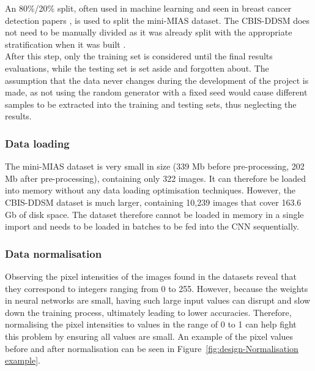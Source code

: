 An 80\%/20\% split, often used in machine learning and seen in breast cancer detection papers \citep{Yue2018}, is used to split the mini-MIAS dataset. The CBIS-DDSM does not need to be manually divided as it was already split with the appropriate stratification when it was built \citep{Lee2017}.\\

After this step, only the training set is considered until the final results evaluations, while the testing set is set aside and forgotten about. The assumption that the data never changes during the development of the project is made, as not using the random generator with a fixed seed would cause different samples to be extracted into the training and testing sets, thus neglecting the results. 

\subsubsection{Data loading}

The mini-MIAS dataset is very small in size (339 Mb before pre-processing, 202 Mb after pre-processing), containing only 322 images. It can therefore be loaded into memory without any data loading optimisation techniques. However, the CBIS-DDSM dataset is much larger, containing 10,239 images that cover 163.6 Gb of disk space. The dataset therefore cannot be loaded in memory in a single import and needs to be loaded in batches to be fed into the CNN sequentially. %

\subsubsection{Data normalisation}

Observing the pixel intensities of the images found in the datasets reveal that they correspond to integers ranging from 0 to 255. However, because the weights in neural networks are small, having such large input values can disrupt and slow down the training process, ultimately leading to lower accuracies. Therefore, normalising the pixel intensities to values in the range of 0 to 1 can help fight this problem by ensuring all values are small. An example of the pixel values before and after normalisation can be seen in Figure~\ref{fig:design-Normalisation example}.

